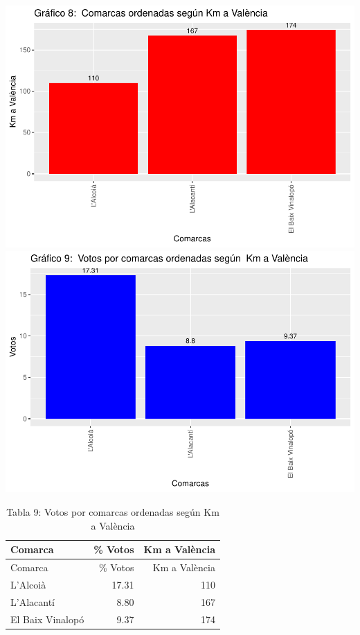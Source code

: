 \documentclass[
]{article}
\begin{document}
\includegraphics{votovalencianista-ea2023_page_files/figure-latex/ordenDistanciacapitalAlicante-1.pdf}
\includegraphics{votovalencianista-ea2023_page_files/figure-latex/ordenDistanciacapitalAlicante-2.pdf}

\begin{longtable}[]{@{}lrr@{}}
\caption{Tabla 9: Votos por comarcas ordenadas según Km a
València}\tabularnewline
\toprule\noalign{}
Comarca & \% Votos & Km a València \\
\midrule\noalign{}
\endfirsthead
\toprule\noalign{}
Comarca & \% Votos & Km a València \\
\midrule\noalign{}
\endhead
\bottomrule\noalign{}
\endlastfoot
L'Alcoià & 17.31 & 110 \\
L'Alacantí & 8.80 & 167 \\
El Baix Vinalopó & 9.37 & 174 \\
\end{longtable}
\end{document}
